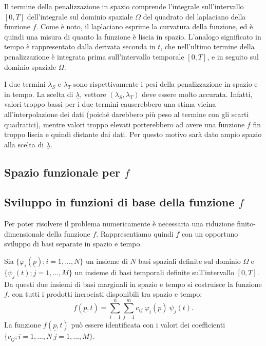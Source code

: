 \documentclass[a4paper,11pt,twoside,openright]{book}							%
\begin{document}
Il termine della penalizzazione in spazio comprende l'integrale sull'intervallo $[0,T]$ dell'integrale sul dominio spaziale $\Omega$ del quadrato del laplaciano della funzione $f$. Come è noto, il laplaciano esprime la curvatura della funzione, ed è quindi una misura di quanto la funzione è liscia in spazio. L'analogo significato in tempo è rappresentato dalla derivata seconda in $t$, che nell'ultimo termine della penalizzazione è integrata prima sull'intervallo temporale $[0,T]$, e in seguito sul dominio spaziale $\Omega$.

I due termini $\lambda_S$ e $\lambda_T$ sono rispettivamente i pesi della penalizzazione in spazio e in tempo. La scelta di $\underline \lambda$, vettore $ (\lambda_S,\lambda_T) $ deve essere molto accurata. Infatti, valori troppo bassi per i due termini causerebbero una stima vicina all'interpolazione dei dati (poiché darebbero più peso al termine con gli scarti quadratici), mentre valori troppo elevati porterebbero ad avere una funzione $f$ fin troppo liscia e quindi distante dai dati. Per questo motivo sarà dato ampio spazio alla scelta di $\underline \lambda$.

\subsection*{Spazio funzionale per $f$}

\subsection*{Sviluppo in funzioni di base della funzione $f$}

Per poter risolvere il problema numericamente è necessaria una riduzione finito-dimensionale della funzione $f$. Rappresentiamo quindi $f$ con un opportuno sviluppo di basi separate in spazio e tempo.

Sia $\{\varphi_i(\underline p); i=1, ... , N\}$ un insieme di $N$ basi spaziali definite sul dominio $\Omega$ e $\{\psi_j(t); j=1, ... , M\}$ un insieme di basi temporali definite sull'intervallo $[0,T]$. Da questi due insiemi di basi marginali in spazio e tempo si costruisce la funzione $f$, con tutti i prodotti incrociati disponibili tra spazio e tempo:
\begin{equation} 
\label{eq:basisexp}
f(\underline p,t)=\sum_{i=1}^n \sum_{j=1}^m c_{ij}\ \varphi_i(\underline p)\ \psi_j(t) .
\end{equation}
La funzione $f(\underline p,t)$ può essere identificata con i valori dei coefficienti $\{c_{ij}; i=1, ... , N\ j=1, ... , M\}$.
\end{document}

